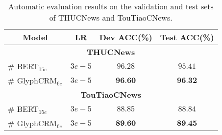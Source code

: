 
\begin{table}[t]
\renewcommand\arraystretch{1.1}
    \centering
     \caption{Automatic evaluation results on the validation and test sets of THUCNews and TouTiaoCNews. }
    \label{tab:exp2}
    \begin{tabular}{lccc}
    \toprule[0.9pt]
    \multicolumn{1}{c}{\textbf{Model}} & \multicolumn{1}{c}{\textbf{LR}} & \multicolumn{1}{c}{\textbf{Dev ACC(\%)}} & \multicolumn{1}{c}{\textbf{Test ACC(\%)}} \\\midrule[0.7pt]
    \multicolumn{4}{c}{\textbf{THUCNews}}\\ \hline
    \# BERT$_{15e}$ & $3e-5$ & $96.28$ & $95.41$ \\
    \# GlyphCRM$_{6e}$ & $3e-5$ & $\textbf{96.60}$ & $\textbf{96.32}$\\ \midrule[0.7pt]
    \multicolumn{4}{c}{\textbf{TouTiaoCNews}}\\ \hline
    \# BERT$_{15e}$ & $3e-5$ & $88.85$ & $88.84$ \\
    \# GlyphCRM$_{6e}$ & $3e-5$ & $\textbf{89.60}$ & $\textbf{89.45}$\\ \bottomrule[0.9pt]
    \end{tabular}
\end{table}


